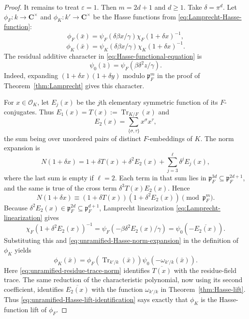 \documentclass[11pt]{amsart}
\theoremstyle{definition}
\theoremstyle{remark}
\newcommand{\C}{\mathbf C}
\newcommand{\cO}{\mathcal O}
\newcommand{\p}{\mathfrak p}
\newcommand{\Tr}{\operatorname{Tr}}
\begin{document}
\begin{proof}
It remains to treat $\varepsilon=1$.  Then $m=2d+1$ and $d\geq1$.
Take $\delta=\pi^d$.  Let $\phi_F:k\to\C^\times$ and
$\phi_K:k'\to\C^\times$ be the Hasse functions from
\eqref{eq:Lamprecht-Hasse-function}:
\[
 \phi_F(\bar x)=
 \psi_F(\delta\beta x/\gamma)\chi_F(1+\delta x)^{-1},
\]
\[
 \phi_K(\bar x)=
 \psi_K(\delta\beta x/\gamma)\chi_K(1+\delta x)^{-1}.
\]
The residual additive character in
\eqref{eq:Hasse-functional-equation} is
\begin{equation}\label{eq:unramified-Hasse-additive-character}
 \psi_0(\bar z)=\psi_F(\beta\delta^2z/\gamma).
\end{equation}
Indeed, expanding $(1+\delta x)(1+\delta y)$ modulo $\p_F^m$ in the
proof of Theorem~\ref{thm:Lamprecht} gives this character.

For $x\in\cO_K$, let $E_j(x)$ be the $j$th elementary symmetric
function of its $F$-conjugates.  Thus
$E_1(x)=T(x):=\Tr_{K/F}(x)$ and
\[
 E_2(x)=\sum_{\{\sigma,\tau\}}x^\sigma x^\tau,
\]
the sum being over unordered pairs of distinct $F$-embeddings of $K$.
The norm expansion is
\[
 N(1+\delta x)
 =1+\delta T(x)+\delta^2E_2(x)
   +\sum_{j=3}^{\ell}\delta^jE_j(x),
\]
where the last sum is empty if $\ell=2$.  Each term in that sum lies in
$\p_F^{3d}\subseteq\p_F^{2d+1}$, and the same is true of the cross term
$\delta^3T(x)E_2(x)$.  Hence
\begin{equation}\label{eq:unramified-Hasse-norm-expansion}
 N(1+\delta x)
 \equiv(1+\delta T(x))(1+\delta^2E_2(x))
 \pmod{\p_F^{m}}.
\end{equation}
Because $\delta^2E_2(x)\in\p_F^{2d}\subseteq\p_F^{d+1}$,
Lamprecht linearization \eqref{eq:Lamprecht-linearization} gives
\[
 \chi_F(1+\delta^2E_2(x))^{-1}
 =\psi_F(-\beta\delta^2E_2(x)/\gamma)
 =\psi_0(-\overline{E_2(x)}).
\]
Substituting this and \eqref{eq:unramified-Hasse-norm-expansion} in the
definition of $\phi_K$ yields
\begin{equation}\label{eq:unramified-Hasse-lift-identification}
 \phi_K(\bar x)
 =\phi_F\!\left(\Tr_{k'/k}(\bar x)\right)
  \psi_0\!\left(-\omega_{k'/k}(\bar x)\right).
\end{equation}
Here \eqref{eq:unramified-residue-trace-norm} identifies
$\overline{T(x)}$ with the residue-field trace.  The same reduction of
the characteristic polynomial, now using its second coefficient,
identifies $\overline{E_2(x)}$ with the function $\omega_{k'/k}$ in
Theorem~\ref{thm:Hasse-lift}.  Thus
\eqref{eq:unramified-Hasse-lift-identification} says exactly that
$\phi_K$ is the Hasse-function lift of $\phi_F$.


\end{proof}
\end{document}
